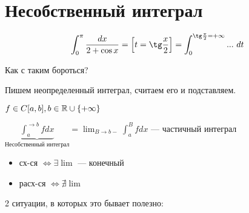 \newpage

\section{Несобственный интеграл}

\begin{motivation}
    \[
        \int_0^\pi \frac{dx}{2 + \cos x} = \left[ t = \tg \frac{x}{2} \right] = \int_0^{\tg \frac{\pi}{2} = +\infty} ... \,\, dt 
    \]

    Как с таким бороться?

    Пишем неопределенный интеграл, считаем его и подставляем.
\end{motivation}

\begin{definition}
    $f \in C[a, b],  b \in \mathbb{R} \cup \{ + \infty \}$

    $\underbrace{\int_a^{\to b} f dx}_{\text{Несобственный интеграл}} = \lim_{B \to b-} \int_a^B f dx$ --- частичный интеграл
\\
\begin{itemize}
    \item сх-ся $\Longleftrightarrow \exists \lim$ --- конечный
    \item расх-ся $\Longleftrightarrow \nexists \lim$
\end{itemize}
    
\end{definition}


2 ситуации, в которых это бывает полезно: \\\\\\


